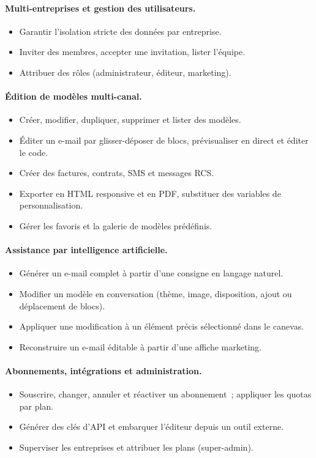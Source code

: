 \paragraph{Multi-entreprises et gestion des utilisateurs.}
\begin{itemize}[leftmargin=1.4cm,nosep]
  \item Garantir l'isolation stricte des données par entreprise.
  \item Inviter des membres, accepter une invitation, lister l'équipe.
  \item Attribuer des rôles (administrateur, éditeur, marketing).
\end{itemize}

\paragraph{Édition de modèles multi-canal.}
\begin{itemize}[leftmargin=1.4cm,nosep]
  \item Créer, modifier, dupliquer, supprimer et lister des modèles.
  \item Éditer un e-mail par glisser-déposer de blocs, prévisualiser en
  direct et éditer le code.
  \item Créer des factures, contrats, SMS et messages RCS.
  \item Exporter en HTML responsive et en PDF, substituer des variables de
  personnalisation.
  \item Gérer les favoris et la galerie de modèles prédéfinis.
\end{itemize}

\paragraph{Assistance par intelligence artificielle.}
\begin{itemize}[leftmargin=1.4cm,nosep]
  \item Générer un e-mail complet à partir d'une consigne en langage
  naturel.
  \item Modifier un modèle en conversation (thème, image, disposition,
  ajout ou déplacement de blocs).
  \item Appliquer une modification à un élément précis sélectionné dans le
  canevas.
  \item Reconstruire un e-mail éditable à partir d'une affiche marketing.
\end{itemize}

\paragraph{Abonnements, intégrations et administration.}
\begin{itemize}[leftmargin=1.4cm,nosep]
  \item Souscrire, changer, annuler et réactiver un abonnement~; appliquer
  les quotas par plan.
  \item Générer des clés d'API et embarquer l'éditeur depuis un outil
  externe.
  \item Superviser les entreprises et attribuer les plans (super-admin).
\end{itemize}

